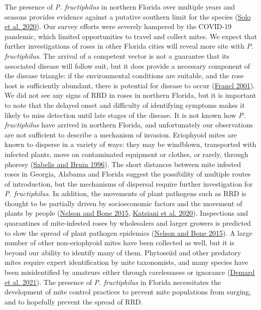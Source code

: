 \documentclass[12pt,final,CPage]{ufthesis}
\begin{document}
{  The presence of \emph{P. fructiphilus} in northern Florida over multiple years and seasons provides evidence against a putative southern limit for the species (\protect\hyperlink{ref-Solo2020}{Solo et al. 2020}). Our survey efforts were severely hampered by the COVID-19 pandemic, which limited opportunities to travel and collect mites. We expect that further investigations of roses in other Florida cities will reveal more site with \emph{P. fructiphilus}. The arrival of a competent vector is not a guarantee that its associated disease will follow suit, but it does provide a necessary component of the disease triangle: if the environmental conditions are suitable, and the rose host is sufficiently abundant, there is potential for disease to occur (\protect\hyperlink{ref-Francl2001}{Francl 2001}). We did not see any signs of RRD in roses in northern Florida, but it is important to note that the delayed onset and difficulty of identifying symptoms makes it likely to miss detection until late stages of the disease. It is not known how \emph{P. fructiphilus} have arrived in northern Florida, and unfortunately our observations are not sufficient to describe a mechanism of invasion. Eriophyoid mites are known to disperse in a variety of ways: they may be windblown, transported with infected plants, move on contaminated equipment or clothes, or rarely, through phoresy (\protect\hyperlink{ref-Sabelis1996}{Sabelis and Bruin 1996}). The short distances between mite infested roses in Georgia, Alabama and Florida suggest the possibility of multiple routes of introduction, but the mechanisms of dispersal require further investigation for \emph{P. fructiphilus}. In addition, the movements of plant pathogens such as RRD is thought to be partially driven by socioeconomic factors and the movement of plants by people (\protect\hyperlink{ref-Nelson2015}{Nelson and Bone 2015}, \protect\hyperlink{ref-Katsiani2020}{Katsiani et al. 2020}). Inspections and quarantines of mite-infested roses by wholesalers and larger growers is predicted to slow the spread of plant pathogen epidemics (\protect\hyperlink{ref-Nelson2015}{Nelson and Bone 2015}). A large number of other non-eriophyoid mites have been collected as well, but it is beyond our ability to identify many of them. Phytoseiid and other predatory mites require expert identification by mite taxonomists, and many species have been misidentified by amateurs either through carelessness or ignorance (\protect\hyperlink{ref-Demard2021}{Demard et al. 2021}). The presence of \emph{P. fructiphilus} in Florida necessitates the development of mite control practices to prevent mite populations from surging, and to hopefully prevent the spread of RRD.

}
\end{document}
